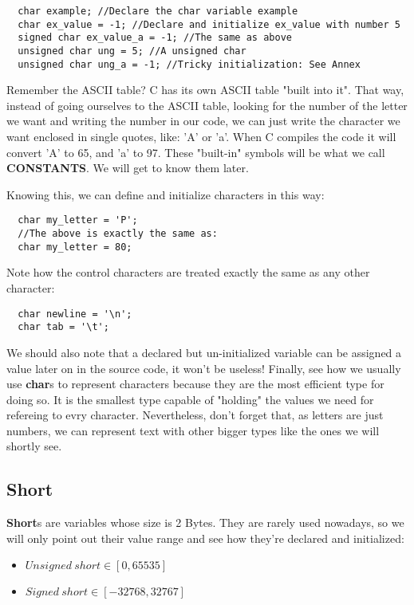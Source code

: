 \documentclass[12pt]{book}
\begin{document}
\begin{verbatim}
  char example; //Declare the char variable example
  char ex_value = -1; //Declare and initialize ex_value with number 5
  signed char ex_value_a = -1; //The same as above
  unsigned char ung = 5; //A unsigned char
  unsigned char ung_a = -1; //Tricky initialization: See Annex
\end{verbatim}

Remember the ASCII table? C has its own ASCII table "built into it". That way, instead of going ourselves to the ASCII table, looking for the number of the letter we want and writing the number in our code, we can just write the character we want enclosed in single quotes, like: 'A' or 'a'. When C compiles the code it will convert 'A' to 65, and 'a' to 97. These "built-in" symbols will be what we call \textbf{CONSTANTS}. We will get to know them later.

Knowing this, we can define and initialize characters in this way:

\begin{verbatim}
  char my_letter = 'P';
  //The above is exactly the same as:
  char my_letter = 80;
\end{verbatim}

Note how the control characters are treated exactly the same as any other character:

\begin{verbatim}
  char newline = '\n';
  char tab = '\t';
\end{verbatim}

We should also note that a declared but un-initialized variable can be assigned a value later on in the source code, it won't be useless! Finally, see how we usually use \textbf{char}s to represent characters because they are the most efficient type for doing so. It is the smallest type capable of "holding" the values we need for refereing to evry character. Nevertheless, don't forget that, as letters are just numbers, we can represent text with other bigger types like the ones we will shortly see.

\subsection{Short}

\textbf{Short}s are variables whose size is 2 Bytes. They are rarely used nowadays, so we will only point out their value range and see how they're declared and initialized:

\begin{itemize}
  \item $Unsigned\ short \in [0, 65535]$
  \item $Signed\ short \in [-32768, 32767]$
\end{itemize}
\end{document}
